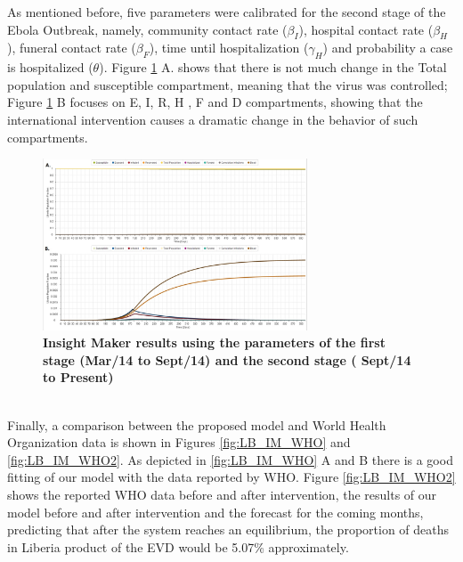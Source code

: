 \documentclass[10pt]{article}
\begin{document}
\noindent As mentioned before, five parameters were calibrated for the second stage of the Ebola Outbreak, namely, community contact rate ($\beta_I$), hospital contact rate ($\beta_H$), funeral contact rate ($\beta_F$), time until hospitalization ($\gamma_H$) and probability a case is hospitalized ($\theta$). Figure \ref{fig:LB_IM_In} A. shows that there is not much change in the Total population and susceptible compartment, meaning that the virus was controlled;  Figure \ref{fig:LB_IM_In} B focuses on E, I, R, H , F and D compartments, showing that the international intervention causes a dramatic change in the behavior of such compartments.

\begin{figure}[!h]
  \centering
  \includegraphics[width=0.7\textwidth]{LB_Int3_SD_IM}
  \caption{ \bf Insight Maker results using the parameters of the first stage (Mar/14 to Sept/14) and the second stage ( Sept/14 to Present)}
\label{fig:LB_IM_In} 
\end{figure}\\



\noindent Finally, a comparison between the proposed model and World Health Organization data is shown in Figures \ref{fig:LB_IM_WHO} and \ref{fig:LB_IM_WHO2}. As depicted in \ref{fig:LB_IM_WHO} A and B there is a good fitting of our model with the data reported by WHO. Figure \ref{fig:LB_IM_WHO2} shows  the reported WHO data before and after intervention, the results of our model before and after intervention and the forecast for the coming months, predicting that after the system reaches an equilibrium, the proportion of deaths in Liberia product of the EVD would be 5.07\% approximately. 
\end{document}
